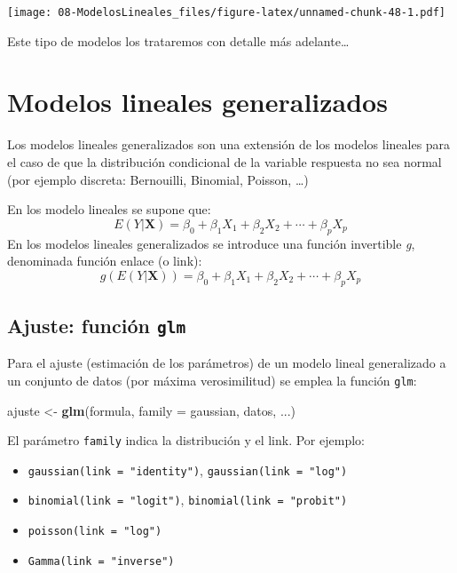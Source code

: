 \documentclass[]{book}
\newenvironment{Shaded}{\begin{snugshade}}{\end{snugshade}}
\newcommand{\KeywordTok}[1]{\textcolor[rgb]{0.13,0.29,0.53}{\textbf{#1}}}
\newcommand{\DataTypeTok}[1]{\textcolor[rgb]{0.13,0.29,0.53}{#1}}
\newcommand{\StringTok}[1]{\textcolor[rgb]{0.31,0.60,0.02}{#1}}
\newcommand{\NormalTok}[1]{#1}
\begin{document}
\texttt{[image: 08-ModelosLineales\_files/figure-latex/unnamed-chunk-48-1.pdf]}

Este tipo de modelos los trataremos con detalle más adelante\ldots{}

\chapter{Modelos lineales
generalizados}\label{modelos-lineales-generalizados}

Los modelos lineales generalizados son una extensión de los modelos
lineales para el caso de que la distribución condicional de la variable
respuesta no sea normal (por ejemplo discreta: Bernouilli, Binomial,
Poisson, \ldots{})

En los modelo lineales se supone que:
\[E( Y | \mathbf{X} ) = \beta_{0}+\beta_{1}X_{1}+\beta_{2}X_{2}+\cdots+\beta_{p}X_{p}\]
En los modelos lineales generalizados se introduce una función
invertible \emph{g}, denominada función enlace (o link):
\[g\left(E(Y | \mathbf{X} )\right) = \beta_{0}+\beta_{1}X_{1}+\beta_{2}X_{2}+\cdots+\beta_{p}X_{p}\]

\section{\texorpdfstring{Ajuste: función
\texttt{glm}}{Ajuste: función glm}}\label{ajuste-funcion-glm}

Para el ajuste (estimación de los parámetros) de un modelo lineal
generalizado a un conjunto de datos (por máxima verosimilitud) se emplea
la función \texttt{glm}:

\begin{Shaded}
\begin{Highlighting}[]
\NormalTok{ajuste <-}\StringTok{ }\KeywordTok{glm}\NormalTok{(formula, }\DataTypeTok{family =}\NormalTok{ gaussian, datos, ...)}
\end{Highlighting}
\end{Shaded}

El parámetro \texttt{family} indica la distribución y el link. Por
ejemplo:

\begin{itemize}
\item
  \texttt{gaussian(link\ =\ "identity")},
  \texttt{gaussian(link\ =\ "log")}
\item
  \texttt{binomial(link\ =\ "logit")},
  \texttt{binomial(link\ =\ "probit")}
\item
  \texttt{poisson(link\ =\ "log")}
\item
  \texttt{Gamma(link\ =\ "inverse")}
\end{itemize}
\end{document}
